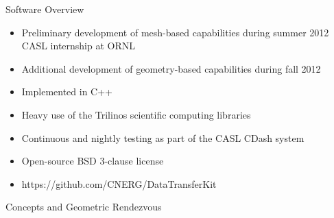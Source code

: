 \documentclass{beamer}
\begin{document}
\begin{frame}{Software Overview}

  \begin{itemize}
  \item Preliminary development of mesh-based capabilities during
    summer 2012 CASL internship at ORNL
    \medskip
  \item Additional development of geometry-based capabilities during
    fall 2012
    \medskip
  \item Implemented in C++
    \medskip
  \item Heavy use of the Trilinos scientific computing libraries
    \medskip
  \item Continuous and nightly testing as part of the CASL CDash
    system
    \medskip
  \item Open-source BSD 3-clause license
    \medskip
  \item https://github.com/CNERG/DataTransferKit
  \end{itemize}
  
\end{frame}

\begin{frame}{Concepts and Geometric Rendezvous}

\end{frame}
\end{document}
